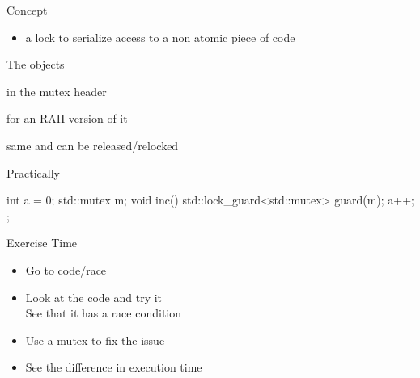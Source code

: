 \begin{frame}[fragile]
  \begin{block}{Concept}
    \begin{itemize}
    \item a lock to serialize access to a non atomic piece of code
    \end{itemize}
  \end{block}
  \pause
  \begin{block}{The objects}
    \begin{description}[labelwidth=1.8cm]
    \item[std::mutex] in the mutex header
    \item[std::lock\_guard] for an RAII version of it
    \item[std::unique\_lock] same and can be released/relocked
    \end{description}
  \end{block}
  \pause
  \begin{exampleblock}{Practically}
    \begin{cppcode*}{}
      int a = 0;
      std::mutex m;
      void inc() {
        std::lock_guard<std::mutex> guard(m);
        a++;
      };
    \end{cppcode*}
  \end{exampleblock}
\end{frame}

\begin{frame}[fragile]
  \begin{alertblock}{Exercise Time}
    \begin{itemize}
    \item Go to code/race
    \item Look at the code and try it\\
      See that it has a race condition
    \item Use a mutex to fix the issue
    \item See the difference in execution time
    \end{itemize}
  \end{alertblock}
\end{frame}

